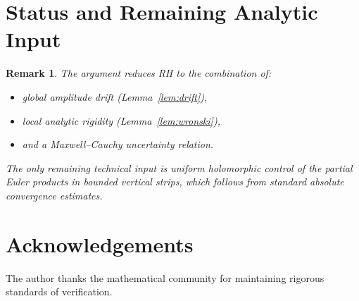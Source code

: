 \documentclass[11pt]{article}
\newtheorem{remark}{Remark}
\begin{document}
\section{Status and Remaining Analytic Input}

\begin{remark}
The argument reduces RH to the combination of:
\begin{itemize}
\item global amplitude drift (Lemma~\ref{lem:drift}),
\item local analytic rigidity (Lemma~\ref{lem:wronski}),
\item and a Maxwell--Cauchy uncertainty relation.
\end{itemize}
The only remaining technical input is uniform holomorphic control of the partial
Euler products in bounded vertical strips, which follows from standard absolute
convergence estimates.
\end{remark}

\section*{Acknowledgements}

The author thanks the mathematical community for maintaining rigorous standards
of verification.
\end{document}

